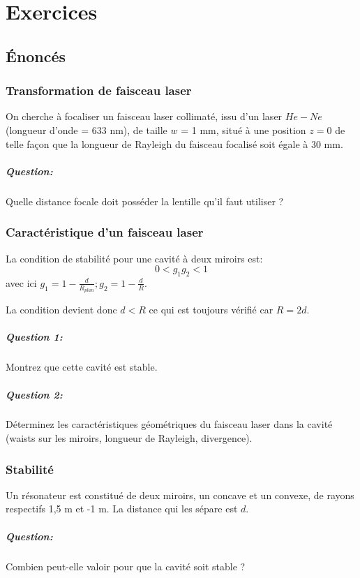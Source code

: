 \documentclass{book}
\begin{document}
\chapter{Exercices}

\section{Énoncés}
\subsection{Transformation de faisceau laser}
On cherche à focaliser un faisceau laser collimaté, issu d'un laser \(He-Ne\) (longueur d'onde = 633 nm), de taille \(w\) = 1 mm, situé à une position \(z=0\) de telle façon que la longueur de Rayleigh du faisceau focalisé soit égale à 30 mm.
\paragraph{Question:}
Quelle distance focale doit posséder la lentille qu'il faut utiliser ?

\subsection{Caractéristique d'un faisceau laser}
La condition de stabilité pour une cavité à deux miroirs est:
\[0 < g_1g_2 < 1\]
avec ici \(g_1=1-\frac d{R_{plan}}; g_2=1-\frac dR\).

La condition devient donc \(d < R\) ce qui est toujours vérifié car \(R=2d\).

\paragraph{Question 1:}
Montrez que cette cavité est stable. 
\paragraph{Question 2:}
Déterminez les caractéristiques géométriques du faisceau laser dans la cavité (waists sur les miroirs, longueur de Rayleigh, divergence).

\subsection{Stabilité}
Un résonateur est constitué de deux miroirs, un concave et un convexe, de rayons respectifs 1,5 m et -1 m. La distance qui les sépare est $d$. 
\paragraph{Question:}
Combien peut-elle valoir pour que la cavité soit stable ? 
\end{document}

